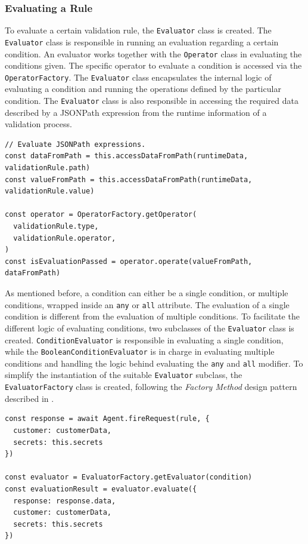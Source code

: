     \subsubsection{Evaluating a Rule} 
      
      To evaluate a certain validation rule, the \verb;Evaluator; class is created. The \verb;Evaluator; class is responsible in running an evaluation regarding a certain condition. An evaluator works together with the \verb;Operator; class in evaluating the conditions given. The specific operator to evaluate a condition is accessed via the \verb;OperatorFactory;. The \verb;Evaluator; class encapsulates the internal logic of evaluating a condition and running the operations defined by the particular condition. The \verb;Evaluator; class is also responsible in accessing the required data described by a JSONPath expression from the runtime information of a validation process. 

      \begin{lstlisting}[style=es6, caption={The usage of OperatorFactory class in the Evaluator class (TypeScript)}]
// Evaluate JSONPath expressions.
const dataFromPath = this.accessDataFromPath(runtimeData, validationRule.path)
const valueFromPath = this.accessDataFromPath(runtimeData, validationRule.value)
        
const operator = OperatorFactory.getOperator(
  validationRule.type,
  validationRule.operator,
)
const isEvaluationPassed = operator.operate(valueFromPath, dataFromPath)
      \end{lstlisting}
      
      As mentioned before, a condition can either be a single condition, or multiple conditions, wrapped inside an \verb;any; or \verb;all; attribute. The evaluation of a single condition is different from the evaluation of multiple conditions. To facilitate the different logic of evaluating conditions, two subclasses of the \verb;Evaluator; class is created. \verb;ConditionEvaluator; is responsible in evaluating a single condition, while the \verb;BooleanConditionEvaluator; is in charge in evaluating multiple conditions and handling the logic behind evaluating the \verb;any; and \verb;all; modifier. To simplify the instantiation of the suitable \verb;Evaluator; subclass, the \verb;EvaluatorFactory; class is created, following the \emph{Factory Method} design pattern described in \autocite[pp. 107-116]{gamma-1995}. 

      \begin{lstlisting}[style=es6, caption={EvaluatorFactory usage in ValidationEngine class (TypeScript)}]
const response = await Agent.fireRequest(rule, {
  customer: customerData,
  secrets: this.secrets
})

const evaluator = EvaluatorFactory.getEvaluator(condition)
const evaluationResult = evaluator.evaluate({
  response: response.data,
  customer: customerData,
  secrets: this.secrets
})
      \end{lstlisting}

